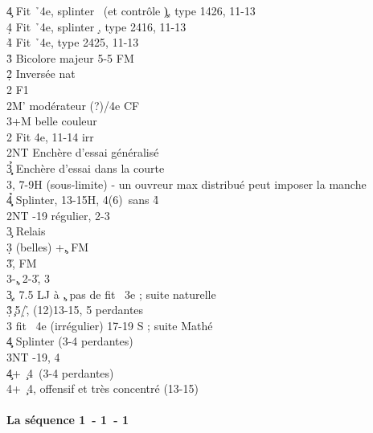 \documentclass[a4paper]{article}
\begin{document}
\begin{bidtable}
4\c \> Fit \h\ 4e, splinter \s\ (et contrôle \c ), type 1426, 11-13\\
4\d \> Fit \h\ 4e, splinter \d , type 2416, 11-13\\
4\h \> Fit \h\ 4e, type 2425, 11-13\-\\
3\h \> Bicolore majeur 5-5 FM\-\\
2\d\h \> Inversée nat\+\\
2\s \> F1\\
2M' \> modérateur (?)/4e CF\\
3\s {}+M belle couleur\-\\
2\s \> Fit 4e, 11-14 irr\+\\
2NT \> Enchère d'essai généralisé\\
3\c\d\h \> Enchère d'essai dans la courte\\
3\s {}\s , 7-9H (sous-limite) - un ouvreur max distribué peut imposer la manche\\
4\c\d\h \> Splinter, 13-15H, 4(6)\s\ sans 4\h \-\\
2NT -19 régulier, 2-3\s \+\\
3\c \> Relais\+\\
3\d {} (belles) +\c , FM\\
3\h {}\h , FM\\
3\s {}-\c , 2-3\h , 3\s \-\-\\
3\c {}, 7.5 LJ à \c , pas de fit \s\ 3e ; suite naturelle\\
3\d\h {}\c\ 5\d /\h , (12)13-15, 5 perdantes\\
3\s \> fit \s\ 4e (irrégulier) 17-19 S ; suite Mathé\\
4\c\d \> Splinter (3-4 perdantes)\\
3NT -19, 4\s \\
4\c {}+ \c\ 4\s\ (3-4 perdantes)\\
4\s {}+ \c\ 4\s , offensif et très concentré (13-15)\-\-
\end{bidtable}

\paragraph{La séquence 1\pdfc\ - 1\pdfh\ - 1\pdfs}
\end{document}
